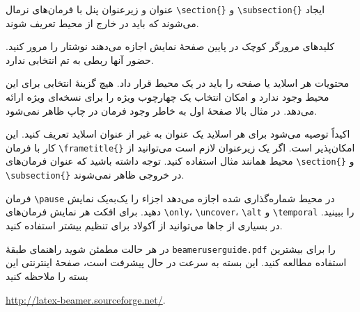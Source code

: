 عنوان و زیرعنوان پنل با فرمان‌های نرمال \verb|\section{}| و \verb|\subsection{}| ایجاد می‌\-شوند که باید در خارج از محیط   تعریف شوند.

کلید‌های مرورگر کوچک در پایین صفحهٔ نمایش اجازه می‌دهند نوشتار‌ را مرور کنید. حضور آنها ربطی به تم انتخابی ندارد.

محتویات هر اسلاید یا صفحه را باید در یک محیط  قرار داد. هیچ گزینهٔ انتخابی برای این محیط وجود ندارد و امکان انتخاب یک چهارچوب ویژه را برای نسخه‌ای ویژه ارائه می‌دهد. در مثال بالا صفحهٔ اول به خاطر وجود فرمان  در چاپ ظاهر نمی‌شود.

اکیداً توصیه می‌شود برای هر اسلاید یک عنوان به غیر از عنوان اسلاید تعریف کنید. این کار با فرمان  \verb|\frametitle{}| امکان‌پذیر است. 
اگر یک زیرعنوان لازم است می‌توانید از محیط   همانند مثال استفاده کنید. توجه داشته باشید که عنوان فرمان‌های  \verb|\section{}|
و \verb|\subsection{}| در خروجی ظاهر نمی‌شوند.

فرمان \verb|\pause| در محیط شماره‌گذاری شده اجازه می‌دهد اجزاء را یک‌به‌یک نمایش دهید. برای افکت هر نمایش فرمان‌های  
\verb|\only|، \verb|\uncover|، \verb|\alt| و \verb|\temporal| را ببینید. در بسیاری از جاها می‌توانید از آکولاد برای تنظیم بیشتر استفاده کنید.

در هر حالت مطمئن شوید راهنمای طبقهٔ \texttt{beameruserguide.pdf} را برای بیشترین استفاده مطالعه کنید. این بسته به سرعت در حال پیشرفت است، صفحهٔ اینترنتی این بسته را ملاحظه کنید
\begin{latin}
\href{http://latex-beamer.sourceforge.net/}{http://latex-beamer.sourceforge.net/}.
\end{latin}


